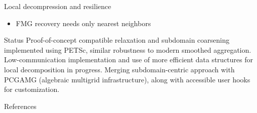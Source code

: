 \documentclass[final,t]{beamer}
\begin{document}
\begin{frame}{}
\begin{columns}
\begin{column}{0.31\textwidth}
\begin{block}{Local decompression and resilience}
\begin{itemize}
        \item FMG recovery needs only \alert{nearest neighbors}
        \end{itemize}
      \end{block}
      \vspace{-2.4em}
      \begin{block}{Status}
        Proof-of-concept compatible relaxation and subdomain coarsening implemented using PETSc, similar robustness to modern smoothed aggregation.
        Low-communication implementation and use of more efficient data structures for local decomposition in progress.
        Merging subdomain-centric approach with PCGAMG (algebraic multigrid infrastructure), along with accessible user hooks for customization.
      \end{block}
      \vspace{-2.4em}
      \begin{block}{References}
        \scriptsize
        \nocite{brandt1994multigrid,bkmms2012}
        \begin{minipage}{\textwidth}
          \begin{multicols}{2}
            
          \end{multicols}
        \end{minipage}
      \end{block}
    \end{column}
  \end{columns}
\end{frame}
\end{document}
